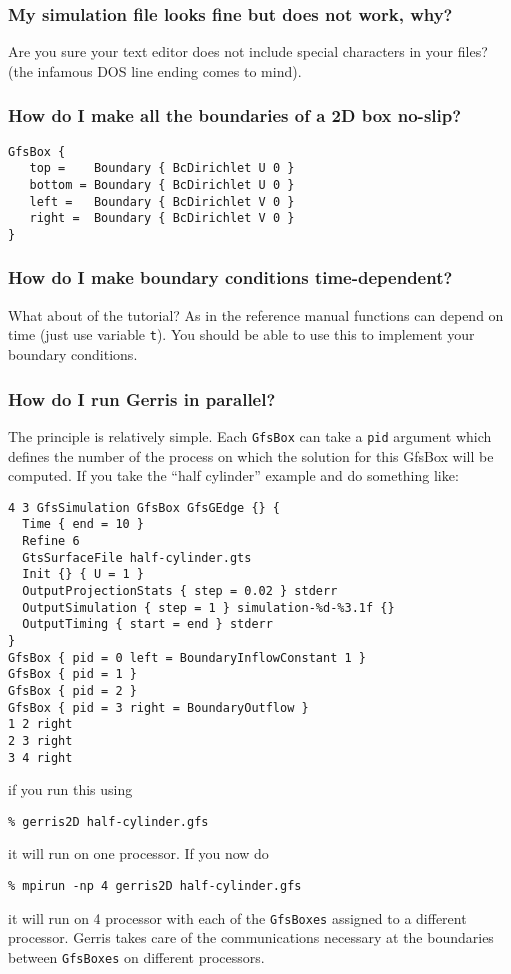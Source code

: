 \documentclass[a4paper]{article}
\begin{document}
\subsubsection{My simulation file looks fine but does not work, why?}

Are you sure your text editor does not
include special characters in your files? (the infamous DOS line ending
comes to mind).

\subsubsection{How do I make all the boundaries of a 2D box no-slip?}

\begin{verbatim}
GfsBox {
   top =    Boundary { BcDirichlet U 0 }
   bottom = Boundary { BcDirichlet U 0 }
   left =   Boundary { BcDirichlet V 0 }
   right =  Boundary { BcDirichlet V 0 }
}
\end{verbatim}

\subsubsection{How do I make boundary conditions time-dependent?}

What about  of the tutorial?
As  in the reference manual
functions can depend on time (just use variable {\tt t}). You should
be able to use this to implement your boundary conditions.

\subsubsection{How do I run Gerris in parallel?}

The principle is relatively simple. Each {\tt GfsBox} can take a {\tt pid}
argument which defines the number of the process on which the solution
for this GfsBox will be computed. If you take the ``half cylinder''
example and do something like:
\begin{verbatim}
4 3 GfsSimulation GfsBox GfsGEdge {} {
  Time { end = 10 }
  Refine 6
  GtsSurfaceFile half-cylinder.gts
  Init {} { U = 1 }
  OutputProjectionStats { step = 0.02 } stderr
  OutputSimulation { step = 1 } simulation-%d-%3.1f {}
  OutputTiming { start = end } stderr
}
GfsBox { pid = 0 left = BoundaryInflowConstant 1 }
GfsBox { pid = 1 }
GfsBox { pid = 2 }
GfsBox { pid = 3 right = BoundaryOutflow }
1 2 right
2 3 right
3 4 right
\end{verbatim}
if you run this using
\begin{verbatim}
% gerris2D half-cylinder.gfs
\end{verbatim}
it will run on one processor. If you now do
\begin{verbatim}
% mpirun -np 4 gerris2D half-cylinder.gfs
\end{verbatim}
it will run on 4 processor with each of the {\tt GfsBoxes} assigned to a
different processor. Gerris takes care of the communications necessary
at the boundaries between {\tt GfsBoxes} on different processors.
\end{document}
